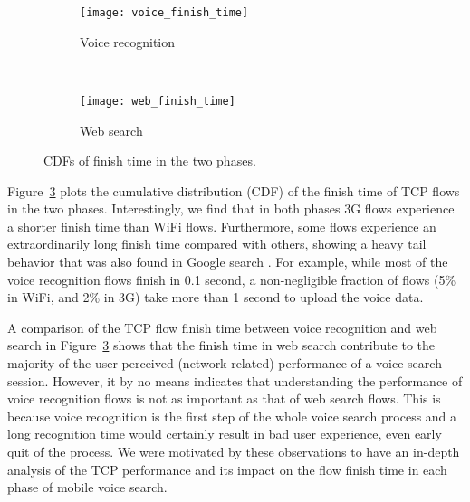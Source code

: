 \begin{figure}[ht]
\centering
\begin{subfigure}[b]{0.8\linewidth}
	\texttt{[image: voice\_finish\_time]}
\caption{Voice recognition}
\label{fig:voice_finish_time}
\end{subfigure} \\
\begin{subfigure}[b]{0.8\linewidth}
	\texttt{[image: web\_finish\_time]}
\caption{Web search}
\label{fig:web_finish_time}
\end{subfigure}
\caption{CDFs of finish time in the two phases.}
\label{fig:finish_time}
\end{figure}


Figure~\ref{fig:finish_time} plots the cumulative distribution (CDF) of the finish time of TCP flows in the two phases. Interestingly, we find that in both phases 3G flows experience a shorter finish time than WiFi flows. Furthermore, some flows experience an extraordinarily long finish time compared with others, showing a heavy tail behavior that was also found in Google search \cite{flach2013reducing}. For example, while most of the voice recognition flows finish in 0.1 second, a non-negligible fraction of flows (5\% in WiFi, and 2\% in 3G) take more than 1 second to upload the voice data. 


A comparison of the TCP flow finish time between voice recognition and web search in Figure~\ref{fig:finish_time} shows that the finish time in web search contribute to the majority of the user perceived (network-related) performance of a voice search session. However, it by no means indicates that understanding the performance of voice recognition flows is not as important as that of web search flows. This is because voice recognition is the first step of the whole voice search process and a long recognition time would certainly result in bad user experience, even early quit of the process. We were motivated by these observations to have an in-depth analysis of the TCP performance and its impact on the flow finish time in each phase of mobile voice search.

